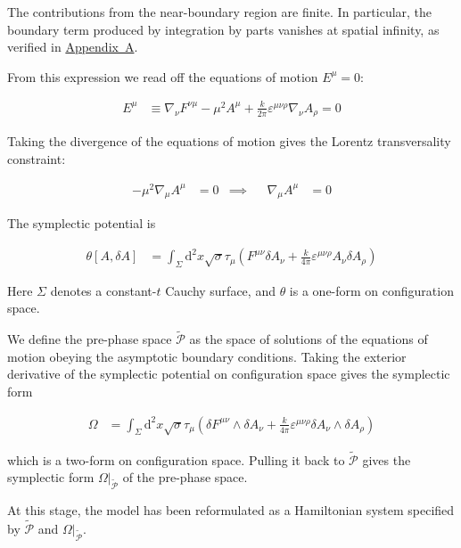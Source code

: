 The contributions from the near-boundary region are finite. In particular, the boundary term produced by integration by parts vanishes at spatial infinity, as verified in \hyperref[app:near-boundary-contributions]{Appendix~A}.

From this expression we read off the equations of motion $E^\mu = 0$:

\begin{align}
E^{\mu} & \equiv \nabla _{\nu}F^{\nu \mu}-\mu ^{2}A^{\mu}+\frac{k}{2\pi}\varepsilon ^{\mu \nu \rho}\nabla _{\nu}A_{\rho}=0
\end{align}

Taking the divergence of the equations of motion gives the Lorentz transversality constraint:

\begin{align}
-\mu ^{2}\nabla _{\mu}A^{\mu} & =0 & \implies &  & \nabla _{\mu}A^{\mu} & =0
\end{align}

The symplectic potential is

\begin{align}
\theta[A,\delta A] & =\int _{\Sigma}\mathrm{d}^{2}x\sqrt{ \sigma }\tau _{\mu}\left( F^{\mu \nu}\delta A_{\nu}+\frac{k}{4\pi}\varepsilon ^{\mu \nu \rho}A_{\nu}\delta A_{\rho} \right)
\end{align}

Here $\Sigma$ denotes a constant-$t$ Cauchy surface, and $\theta$ is a one-form on configuration space.

We define the pre-phase space $\widetilde{\mathcal{P}}$ as the space of solutions of the equations of motion obeying the asymptotic boundary conditions. Taking the exterior derivative of the symplectic potential on configuration space gives the symplectic form

\begin{align}
\Omega & =\int _{\Sigma}\mathrm{d}^{2}x\sqrt{ \sigma }\tau _{\mu}\left(\delta F^{\mu \nu}\wedge\delta A_{\nu}+\frac{k}{4\pi}\varepsilon ^{\mu \nu \rho}\delta A_{\nu}\wedge\delta A_{\rho}\right)
\end{align}

which is a two-form on configuration space. Pulling it back to $\widetilde{\mathcal{P}}$ gives the symplectic form $\Omega|_{\widetilde{\mathcal{P}}}$ of the pre-phase space.

At this stage, the model has been reformulated as a Hamiltonian system specified by $\widetilde{\mathcal{P}}$ and $\Omega|_{\widetilde{\mathcal{P}}}$.


